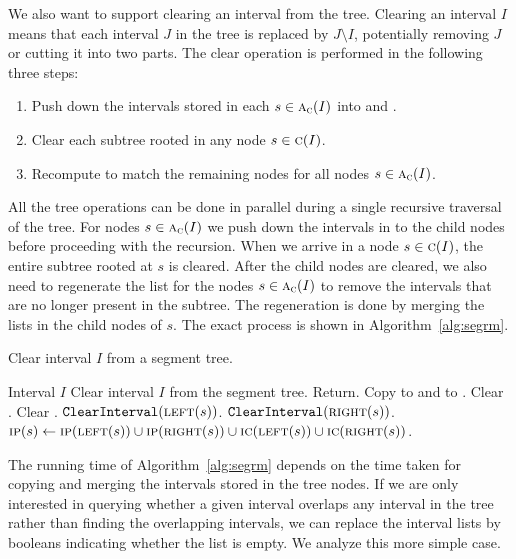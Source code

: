 \documentclass[english,gradu]{tktltiki2018}
\begin{document}
We also want to support clearing an interval from the tree.
Clearing an interval $I$ means that each interval $J$ in the tree is replaced by $J\setminus I$, potentially removing $J$ or cutting it into two parts.
The clear operation is performed in the following three steps:
\begin{enumerate}
\item Push down the intervals stored in each $s\in\textsc{a}_{\textsc{c}}(I)$ into  and .
\item Clear each subtree rooted in any node $s\in\textsc{c}(I)$.
\item Recompute  to match the remaining nodes for all nodes $s\in\textsc{a}_{\textsc{c}}(I)$.
\end{enumerate}

All the tree operations can be done in parallel during a single recursive traversal of the tree.
For nodes $s\in\textsc{a}_{\textsc{c}}(I)$ we push down the intervals in  to the child nodes before proceeding with the recursion.
When we arrive in a node $s\in\textsc{c}(I)$, the entire subtree rooted at $s$ is cleared.
After the child nodes are cleared, we also need to regenerate the  list for the nodes $s\in\textsc{a}_{\textsc{c}}(I)$ to remove the intervals that are no longer present in the subtree.
The regeneration is done by merging the lists in the child nodes of $s$.
The exact process is shown in Algorithm~\ref{alg:segrm}.

\begin{algorithm}
\caption{Clear interval $I$ from a segment tree.}\label{alg:segrm}
\begin{algorithmic}
\Require Interval $I$
\Ensure Clear interval $I$ from the segment tree.
		\State Return.
	\EndIf
		\State Copy  to  and to .
	\EndIf
	\State Clear .
	\State Clear .
		\State $\texttt{ClearInterval}(\textsc{left}(s))$.
		\State $\texttt{ClearInterval}(\textsc{right}(s))$.
	\EndIf
		\State $\textsc{ip}(s)\gets \textsc{ip}(\textsc{left}(s)) \cup \textsc{ip}(\textsc{right}(s)) \cup \textsc{ic}(\textsc{left}(s)) \cup \textsc{ic}(\textsc{right}(s))$.
	\EndIf
\EndProcedure
\end{algorithmic}
\end{algorithm}

The running time of Algorithm~\ref{alg:segrm} depends on the time taken for copying and merging the intervals stored in the tree nodes.
If we are only interested in querying whether a given interval overlaps any interval in the tree rather than finding the overlapping intervals, we can replace the interval lists by booleans indicating whether the list is empty.
We analyze this more simple case.
\end{document}
